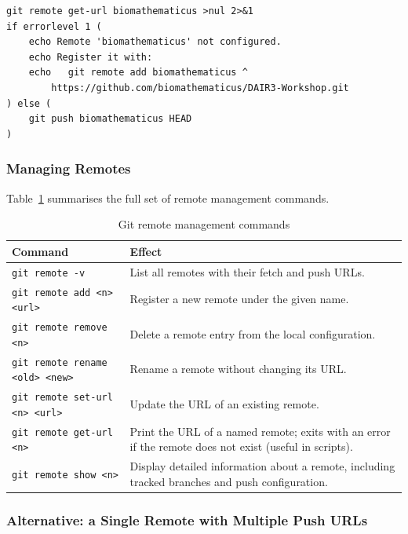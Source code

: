 \begin{lstlisting}[style=psstyle, caption={Guard a push with a remote existence check (PowerShell / batch)}]
git remote get-url biomathematicus >nul 2>&1
if errorlevel 1 (
    echo Remote 'biomathematicus' not configured.
    echo Register it with:
    echo   git remote add biomathematicus ^
        https://github.com/biomathematicus/DAIR3-Workshop.git
) else (
    git push biomathematicus HEAD
)
\end{lstlisting}

\subsubsection{Managing Remotes}

Table~\ref{tab:git-remote-commands} summarises the full set of remote
management commands.

\begin{table}[h]
\centering
\caption{Git remote management commands}
\label{tab:git-remote-commands}
\begin{tabular}{lp{8.5cm}}
\toprule
Command & Effect \\
\midrule
\texttt{git remote -v} &
  List all remotes with their fetch and push URLs. \\
\texttt{git remote add <n> <url>} &
  Register a new remote under the given name. \\
\texttt{git remote remove <n>} &
  Delete a remote entry from the local configuration. \\
\texttt{git remote rename <old> <new>} &
  Rename a remote without changing its URL. \\
\texttt{git remote set-url <n> <url>} &
  Update the URL of an existing remote. \\
\texttt{git remote get-url <n>} &
  Print the URL of a named remote; exits with an error if
  the remote does not exist (useful in scripts). \\
\texttt{git remote show <n>} &
  Display detailed information about a remote, including
  tracked branches and push configuration. \\
\bottomrule
\end{tabular}
\end{table}

\subsubsection{Alternative: a Single Remote with Multiple Push URLs}

